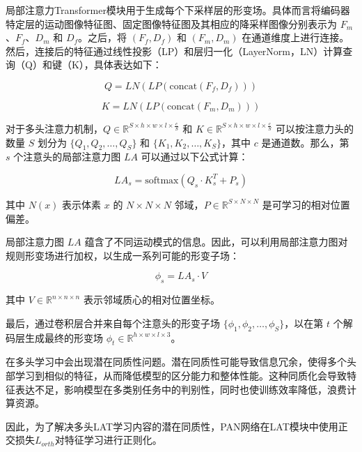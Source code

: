 局部注意力Transformer模块用于生成每个下采样层的形变场。具体而言将编码器特定层的运动图像特征图、固定图像特征图及其相应的降采样图像分别表示为 \( F_m \)、\( F_f \)、\( D_m \) 和 \( D_f \)。之后，将 \( (F_f, D_f) \) 和 \( (F_m, D_m) \) 在通道维度上进行连接。然后，连接后的特征通过线性投影（LP）和层归一化（LayerNorm，LN）计算查询（Q）和键（K），具体表达如下：

\begin{equation}
    Q = LN(LP(\text{concat}(F_f, D_f)))
\end{equation}

\begin{equation}
    K = LN(LP(\text{concat}(F_m, D_m)))
\end{equation}

对于多头注意力机制，\( Q \in \mathbb{R}^{S \times h \times w \times l \times \frac{c}{S}} \) 和 \( K \in \mathbb{R}^{S \times h \times w \times l \times \frac{c}{S}} \) 可以按注意力头的数量 \( S \) 划分为 \( \{ Q_1, Q_2, \ldots, Q_S \} \) 和 \( \{ K_1, K_2, \ldots, K_S \} \)，其中 \( c \) 是通道数。那么，第 \( s \) 个注意头的局部注意力图 \( LA \) 可以通过以下公式计算：

\begin{equation}
    LA_s = \text{softmax}\left(Q_s \cdot K_s^T + P_s\right)
\end{equation}

其中 \( N(x) \) 表示体素 \( x \) 的 \( N \times N \times N \) 邻域，\( P \in \mathbb{R}^{S \times N \times N} \) 是可学习的相对位置偏差。

局部注意力图 \( LA \) 蕴含了不同运动模式的信息。因此，可以利用局部注意力图对规则形变场进行加权，以生成一系列可能的形变子场：

\begin{equation}
    \phi_s = LA_s \cdot V
\end{equation}

其中 \( V \in \mathbb{R}^{n \times n \times n} \) 表示邻域质心的相对位置坐标。

最后，通过卷积层合并来自每个注意头的形变子场 \( \{ \phi_1, \phi_2, \ldots, \phi_S \} \)，以在第 \( t \) 个解码层生成最终的形变场 \( \phi_t \in \mathbb{R}^{h \times w \times l \times 3} \)。

在多头学习中会出现潜在同质性问题。潜在同质性可能导致信息冗余，使得多个头部学习到相似的特征，从而降低模型的区分能力和整体性能。这种同质化会导致特征表达不足，影响模型在多类别任务中的判别性，同时也使训练效率降低，浪费计算资源。

因此，为了解决多头LAT学习内容的潜在同质性，PAN网络在LAT模块中使用正交损失$L_{orth}$对特征学习进行正则化\cite{brock2016neural}。

